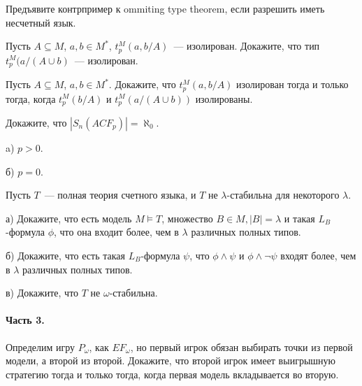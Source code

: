 \begin{task}
    Предъявите контрпример к ommiting type theorem, если разрешить иметь несчетный
    язык.
\end{task}

\begin{task}
    Пусть $A \subseteq M$, $a, b \in M^{*}$, $t_p^M(a, b / A)$~---
    изолирован. Докажите, что тип $t_p^M(a / (A \cup {b})$~--- изолирован.
\end{task}

\begin{task}
     Пусть $A \subseteq M$, $a, b \in M^{*}$. Докажите, что $t_p^M(a, b / A)$
     изолирован тогда и только тогда, когда $t_p^M(b / A)$ и $t_p^M(a / (A \cup
     {b}))$ изолированы.
\end{task}

\begin{task}
    Докажите, что $|S_n(ACF_p)| = \aleph_0$.

    a) $p > 0$.

    б) $p = 0$.
\end{task}

\begin{task}{19}
    Пусть $T$~--- полная теория счетного языка, и $T$ не $\lambda$-стабильна для
    некоторого $\lambda$.

	а) Докажите, что есть модель $M \models T$, множество $B \in M, |B| = \lambda$
    и такая $L_B$-формула $\phi$, что она входит более, чем в $\lambda$ различных
    полных типов.

    б) Докажите, что есть такая $L_B$-формула $\psi$, что $\phi \land \psi$ и $\phi
    \land \neg \psi$ входят более, чем в $\lambda$ различных полных типов.


    в) Докажите, что $T$ не $\omega$-стабильна.
\end{task}


\breakline

\paragraph{Часть 3.}

\begin{task}
    Определим игру $P_{\omega}$, как $EF_{\omega}$, но первый игрок обязан выбирать
    точки из первой модели, а второй из второй. Докажите, что второй игрок имеет
    выигрышную стратегию тогда и только тогда, когда первая модель вкладывается во
    вторую. 
\end{task}